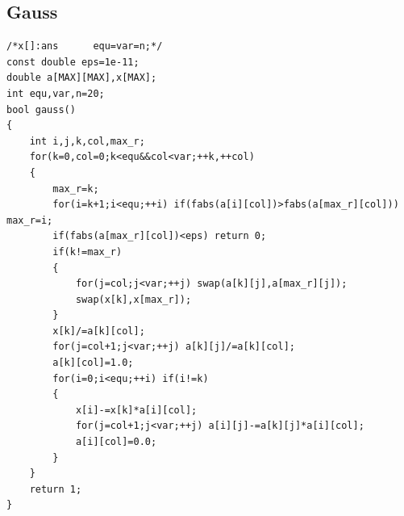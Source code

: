 \documentclass[twoside]{article}
\begin{document}
\subsection{Gauss}
\begin{lstlisting}
/*x[]:ans      equ=var=n;*/
const double eps=1e-11;
double a[MAX][MAX],x[MAX];
int equ,var,n=20;
bool gauss()
{
    int i,j,k,col,max_r;
    for(k=0,col=0;k<equ&&col<var;++k,++col)
    {
        max_r=k;
        for(i=k+1;i<equ;++i) if(fabs(a[i][col])>fabs(a[max_r][col])) max_r=i;
        if(fabs(a[max_r][col])<eps) return 0;
        if(k!=max_r)
        {
            for(j=col;j<var;++j) swap(a[k][j],a[max_r][j]);
            swap(x[k],x[max_r]);
        }
        x[k]/=a[k][col];
        for(j=col+1;j<var;++j) a[k][j]/=a[k][col];
        a[k][col]=1.0;
        for(i=0;i<equ;++i) if(i!=k)
        {
            x[i]-=x[k]*a[i][col];
            for(j=col+1;j<var;++j) a[i][j]-=a[k][j]*a[i][col];
            a[i][col]=0.0;
        }
    }
    return 1;
}
\end{lstlisting}
\end{document}

